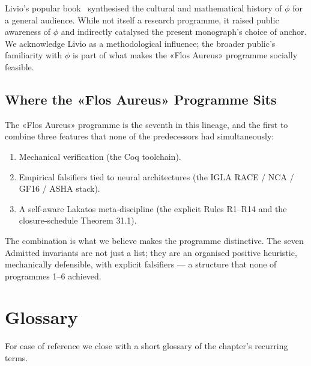 Livio's popular book~\cite{livio_fibonacci_numbers} synthesised the cultural and mathematical history of $\phi$ for a general audience. While not itself a research programme, it raised public awareness of $\phi$ and indirectly catalysed the present monograph's choice of anchor. We acknowledge Livio as a methodological influence; the broader public's familiarity with $\phi$ is part of what makes the «Flos Aureus» programme socially feasible.

\subsection{Where the «Flos Aureus» Programme Sits}
\label{sec:31-hist-flos}

The «Flos Aureus» programme is the seventh in this lineage, and the first to combine three features that none of the predecessors had simultaneously:
\begin{enumerate}
    \item Mechanical verification (the Coq toolchain).
    \item Empirical falsifiers tied to neural architectures (the IGLA RACE / NCA / GF16 / ASHA stack).
    \item A self-aware Lakatos meta-discipline (the explicit Rules R1–R14 and the closure-schedule Theorem 31.1).
\end{enumerate}

The combination is what we believe makes the programme distinctive. The seven Admitted invariants are not just a list; they are an organised positive heuristic, mechanically defensible, with explicit falsifiers — a structure that none of programmes 1–6 achieved.

\section{Glossary}
\label{sec:31-glossary}

For ease of reference we close with a short glossary of the chapter's recurring terms.

